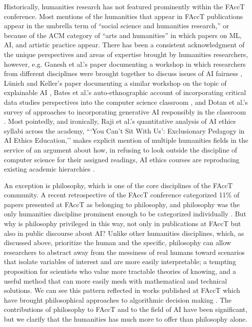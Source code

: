 Historically, humanities research has not featured prominently within the FAccT conference. Most mentions of the humanities that appear in FAccT publications appear in the umbrella term of ``social science and humanities research,'' or because of the ACM category of ``arts and humanities'' in which papers on ML, AI, and artistic practice appear. There has been a consistent acknowledgment of the unique perspectives and areas of expertise brought by humanities researchers, however, e.g. Ganesh et al.’s paper documenting a workshop in which researchers from different disciplines were brought together to discuss issues of AI fairness \cite{Ganesh_Dechesne_Waseem_2020}, Lünich and Keller’s paper documenting a similar workshop on the topic of explainable AI \cite{Lünich_Keller_2024}, Bates et al.’s auto-ethnographic account of incorporating critical data studies perspectives into the computer science classroom \cite{Bates_2020}, and Dotan et al.’s survey of approaches to incorporating generative AI responsibly in the classroom \cite{Dotan_Parker_Radzilowicz_2024}. Most pointedly, and ironically, Raji et al.’s quantitative analysis of AI ethics syllabi across the academy, ```You Can’t Sit With Us’: Exclusionary Pedagogy in AI Ethics Education,'' makes explicit mention of multiple humanities fields in the service of an argument about how, in refusing to look outside the discipline of computer science for their assigned readings, AI ethics courses are reproducing existing academic hierarchies \cite{Raji_Scheuerman_Amironesei_2021}. 

An exception is philosophy, which is one of the core disciplines of the FAccT community. A recent retrospective of the FAccT conference categorized 11\% of papers presented at FAccT as belonging to philosophy, and philosophy was the only humanities discipline prominent enough to be categorized individually \citet{Laufer_Jain_Cooper_Kleinberg_Heidari_2022}. But why is philosophy privileged in this way, not only in publications at FAccT but also in public discourse about AI? Unlike other humanities disciplines, which, as discussed above, prioritize the human and the specific, philosophy can allow researchers to abstract away from the messiness of real humans toward scenarios that isolate variables of interest and are more easily interpretable; a tempting proposition for scientists who value more tractable theories of knowing, and a useful method that can more easily mesh with mathematical and technical solutions. We can see this pattern reflected in works published at FAccT which have brought philosophical approaches to algorithmic decision making \citep{Cooper_Moss_Laufer_Nissenbaum_2022, Susser_2022, Jain_Suriyakumar_Creel_Wilson_2024}. The contributions of philosophy to FAccT and to the field of AI have been significant, but we clarify that the humanities has much more to offer than philosophy alone.

